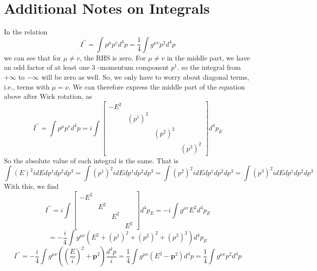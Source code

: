 \section{Additional Notes on Integrals}
In the relation
\begin{equation}I^{\prime \prime}=\int p^{\mu} p^{v} d^{4} p=\frac{1}{4} \int g^{\mu v} p^{2} d^{4} p\end{equation}
we can see that for $\mu \neq v$, the RHS is zero. For $\mu \neq v$ in the middle part, we have an odd factor of at least one 3 -momentum component $p^{1}$. so the integral from $+\infty$ to $-\infty$ will be zero as well. So, we only have to worry about diagonal terms, i.e., terms with $\mu=\nu .$ We can therefore express the middle part of the equation above after Wick rotation, as
$$I^{\prime \prime}=\int p^{\mu} p^{v} d^{4} p=i \int\left[\begin{array}{cccc}
-E^{2} & & & \\
& \left(p^{1}\right)^{2} & & \\
& & \left(p^{2}\right)^{2} & \\
& & & \left(p^{3}\right)^{2}
\end{array}\right] d^{4} p_{E}$$
So the absolute value of each integral is the same. That is
$$\int(E)^{2} i d E d p^{1} d p^{2} d p^{3}=\int\left(p^{1}\right)^{2} i d E d p^{1} d p^{2} d p^{3}=\int\left(p^{2}\right)^{2} i d E d p^{1} d p^{2} d p^{3}=\int\left(p^{3}\right)^{2} i d E d p^{1} d p^{2} d p^{3}$$
With this, we find
$$I^{\prime\prime}=i \int\left[\begin{array}{cccc}
-E^{2} & & & \\
& E^{2} & & \\
& & E^{2} & \\
& & & E^{2}
\end{array}\right]d^{4} p_{E}=-i \int g^{\mu v} E^{2} d^{4} p_{E}
$$
$$=-\frac{i}{4} \int g^{\mu \nu}\left(E^{2}+\left(p^{1}\right)^{2}+\left(p^{2}\right)^{2}+\left(p^{3}\right)^{2}\right) d^{4} p_{E}$$
\begin{equation}I^{\prime\prime}=-\frac{i}{4} \int g^{\mu \nu}\left(\left(\frac{E}{i}\right)^{2}+\mathbf{p}^{2}\right) \frac{d^{4} p}{i}=\frac{1}{4} \int g^{\mu \nu}\left(E^{2}-\mathbf{p}^{2}\right) d^{4} p=\frac{1}{4} \int g^{\mu \nu} p^{2} d^{4} p\end{equation}